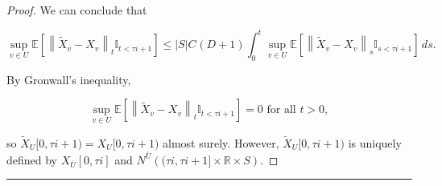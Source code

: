 \documentclass[12pt]{article}
\newcommand{\mb}{\mathbb}
\newcommand{\ov}{\overline}
\newcommand{\te}{\text}
\newcommand{\lin}{\rule{\linewidth}{0.4 pt}}
\newcommand{\ex}[1]{\mb{E}\left[#1\right]}			%
\renewcommand{\v}{v}							%
\renewcommand{\U}{U}							%
\renewcommand{\S}{S}							%
\renewcommand{\t}{t}							%
\renewcommand{\tt}{s}							%
\newcommand{\X}{X}								%
\newcommand{\vind}[1]{^{#1}}					%
\newcommand{\cind}[1]{_{#1}}					%
\newcommand{\cl}{\ov}							%
\newcommand{\tip}[1]{#1}						%
\newcommand{\const}{C}							%
\newcommand{\degr}{D}							%
\newcommand{\poiss}{N}							%
\newcommand{\alt}[1]{\widetilde{#1}}			%
\newcommand{\indx}[1]{_{#1}}					%
\newcommand{\rt}{\tau}							%
\begin{document}
\begin{proof}
We can conclude that

\[\sup_{\v\in \U}\ex{\left\|\alt{\X}\cind{\v}\tip{} - \X\cind{\v}\tip{}\right\|_{\t}\mb{I}_{\t <\rt{i+1}}} \leq |\S|\const\indx{}(\degr+1)\int_0^\t\sup_{v\in\U}\ex{\left\|\alt{\X}\cind{\v}\tip{} - \X\cind{\v}\tip{}\right\|_\tt\mb{I}_{\tt < \rt{i+1}}}\,d\tt.\]

By Gronwall's inequality,

\[\sup_{v\in \U}\ex{\left\|\alt{\X}\cind{\v}\tip{} - \X\cind{\v}\tip{}\right\|_\t\mb{I}_{\t < \rt{i+1}}} = 0 \te{ for all } \t > 0,\]

so \(\alt{\X}\cind{\U}\tip{[0,\rt{i+1})} = \X\cind{\U}\tip{[0,\rt{i+1})}\) almost surely. However, \(\alt{\X}\cind{\U}\tip{[0,\rt{i+1})}\) is uniquely defined by \(\X\cind{\cl{\U}}\tip{[0,\rt{i}]}\) and \(\poiss\vind{\cl{\U}}\left((\rt{i},\rt{i+1}]\times \mb{R}\times \S\right)\).
\end{proof}

\lin
\end{document}
